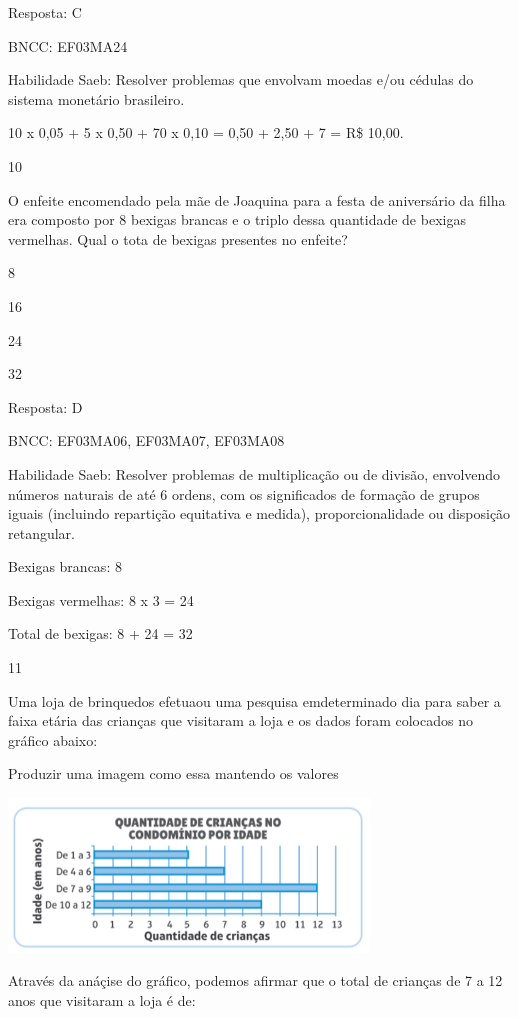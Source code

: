 \begin{escolha}
Resposta: C

BNCC: EF03MA24

Habilidade Saeb: Resolver problemas que envolvam moedas e/ou cédulas do
sistema monetário brasileiro.

10 x 0,05 + 5 x 0,50 + 70 x 0,10 = 0,50 + 2,50 + 7 = R\$ 10,00.

\num{10}

O enfeite encomendado pela mãe de Joaquina para a festa de aniversário
da filha era composto por 8 bexigas brancas e o triplo dessa quantidade
de bexigas vermelhas. Qual o tota de bexigas presentes no enfeite?

\begin{escolha}

\item
  8
\item
  16
\item
  24
\item
  32
\end{escolha}

Resposta: D

BNCC: EF03MA06, EF03MA07, EF03MA08

Habilidade Saeb: Resolver problemas de multiplicação ou de divisão,
envolvendo números naturais de até 6 ordens, com os significados de
formação de grupos iguais (incluindo repartição equitativa e medida),
proporcionalidade ou disposição retangular.

Bexigas brancas: 8

Bexigas vermelhas: 8 x 3 = 24

Total de bexigas: 8 + 24 = 32

\num{11}

Uma loja de brinquedos efetuaou uma pesquisa emdeterminado dia para
saber a faixa etária das crianças que visitaram a loja e os dados foram
colocados no gráfico abaixo:

Produzir uma imagem como essa mantendo os valores

\includegraphics[width=3.77564in,height=1.60972in]{media/image136.png}

Através da anáçise do gráfico, podemos afirmar que o total de crianças
de 7 a 12 anos que visitaram a loja é de:


\end{escolha}
